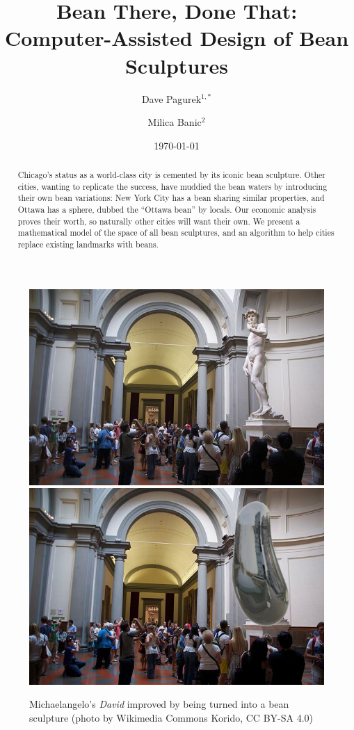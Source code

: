 \documentclass[%
reprint,
twocolumn,
nofootinbib,
 amsmath,amssymb,
 aps,
]{revtex4-2}
\begin{document}

\title{
Bean There, Done That: Computer-Assisted Design of Bean Sculptures}

\author{Dave Pagurek$^{1,*}$}
\author{Milica Banic$^2$}

\date{\today}%

\begin{abstract}
Chicago's status as a world-class city is cemented by its iconic bean sculpture. Other cities, wanting to replicate the success, have muddied the bean waters by introducing their own bean variations: New York City has a bean sharing similar properties, and Ottawa has a sphere, dubbed the ``Ottawa bean'' by locals. Our economic analysis proves their worth, so naturally other cities will want their own. We present a mathematical model of the space of all bean sculptures, and an algorithm to help cities replace existing landmarks with beans.
\end{abstract}

\maketitle

\onecolumngrid

\begin{figure}[h]
    \centering
    \includegraphics[width=0.44\linewidth]{img/david-tourists.jpg}
        \includegraphics[width=0.44\linewidth]{img/david-tourists-bean.jpg}
    \caption{Michaelangelo's \emph{David} improved by being turned into a bean sculpture (photo by Wikimedia Commons Korido, CC BY-SA 4.0)}
    \label{fig:teaser}
\end{figure}
\twocolumngrid
\end{document}
